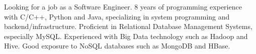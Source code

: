 

\begin{cvparagraph}

Looking for a job as a Software
Engineer. 8 years of programming experience with C/C++, Python and
Java, specializing in system programming and
backend/infrastructure. Proficient in Relational Database Management
Systems, especially MySQL. Experienced with Big Data technology such
as Hadoop and Hive. Good exposure to NoSQL databases such as MongoDB
and HBase.
\end{cvparagraph}
